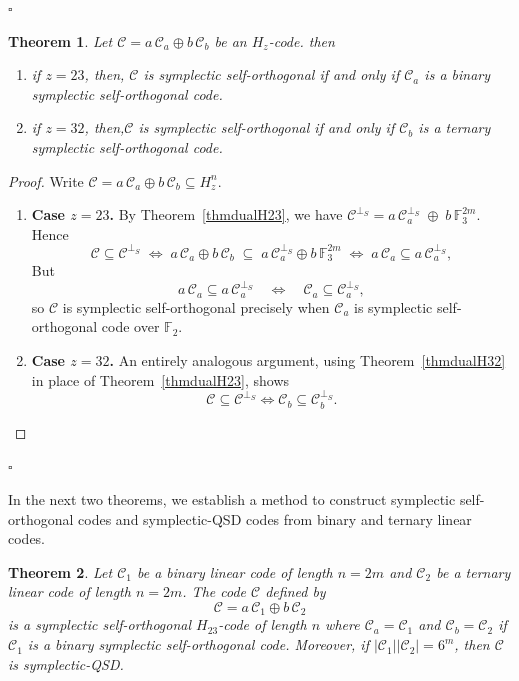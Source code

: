 \documentclass[11pt,a4paper]{article}
\def\qed{\hfill {$\square$}\goodbreak \medskip}
\newtheorem{theorem}{Theorem}[section]
\theoremstyle{definition}
\numberwithin{equation}{section}
\def\C{{\mathcal{C}}}
\begin{document}
\qed





\begin{theorem}\label{thmorthH23} 
Let $\C=a\, \C_a \oplus b\, \C_b$ be an $H_{z}$-code. then

\begin{enumerate}
\item if $z=23$, then, $\C$ is symplectic self-orthogonal if and only if $\C_a$ is a binary symplectic self-orthogonal code.
\item if $z=32$, then,$\C$ is symplectic self-orthogonal if and only if $\C_b$ is a ternary symplectic self-orthogonal code.
\end{enumerate}
\end{theorem}


\begin{proof}
Write \(\C=a\,\C_a\oplus b\,\C_b\subseteq H_z^n\).
\begin{enumerate}
\item \medskip
\noindent\textbf{Case \(z=23\).} By Theorem~\ref{thmdualH23}, we have $\C^{\perp_S}
= a\,\C_a^{\perp_S}\;\oplus\;b\,\mathbb{F}_3^{2m}.$
Hence
\[
\C\subseteq \C^{\perp_S}
\;\Longleftrightarrow\;
a\,\C_a\oplus b\,\C_b
\;\subseteq\;
a\,\C_a^{\perp_S}\oplus b\,\mathbb{F}_3^{2m}
\;\Longleftrightarrow\;
a\,\C_a\subseteq a\,\C_a^{\perp_S},
\]
  But
\[
a\,\C_a\subseteq a\,\C_a^{\perp_S}
\quad\Longleftrightarrow\quad
\C_a\subseteq \C_a^{\perp_S},
\]
so \(\C\) is symplectic self-orthogonal precisely when \(\C_a\) is symplectic self-orthogonal code over \(\mathbb{F}_2\).  
\item \textbf{Case \(z=32\).} An entirely analogous argument, using Theorem~\ref{thmdualH32} in place of Theorem~\ref{thmdualH23}, shows
\[
\C\subseteq\C^{\perp_S}
\iff
\C_b\subseteq\C_b^{\perp_S}.
\]
\end{enumerate}
\end{proof}

\qed

\par In the next two theorems, we establish a method to construct symplectic self-orthogonal codes and symplectic-QSD codes from binary and ternary linear codes. 
\begin{theorem}\label{thmbinaryternary1} Let $\C_1$ be a binary linear code of length $n=2m$ and $\C_2$ be a ternary linear code of length $n=2m$. The code $\C$ defined by
\[\C=a\,\C_1\oplus b\,\C_2\] 
is a symplectic self-orthogonal $H_{23}$-code of length $n$ where $\C_a=\C_1$ and $\C_b=\C_2$ if $\C_1$ is a binary symplectic  self-orthogonal code. Moreover, if $|\C_1||\C_2|=  6^{m}$, then $\C$ is symplectic-QSD.
\end{theorem}
\end{document}
